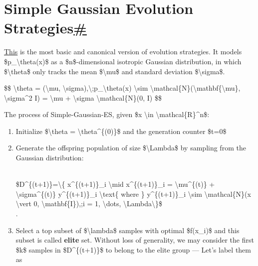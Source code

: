 \section{\texorpdfstring{Simple Gaussian Evolution Strategies\hyperref[simple-gaussian-evolution-strategies]{\#}}{Simple Gaussian Evolution Strategies\#}}\label{simple-gaussian-evolution-strategies}

\href{http://blog.otoro.net/2017/10/29/visual-evolution-strategies/}{This} is the most basic and canonical version of evolution strategies. It models \$p\_\textbackslash theta(x)\$ as a \$n\$-dimensional isotropic Gaussian distribution, in which \$\textbackslash theta\$ only tracks the mean \$\textbackslash mu\$ and standard deviation \$\textbackslash sigma\$.

\$\$ \textbackslash theta = (\textbackslash mu, \textbackslash sigma),\textbackslash;p\_\textbackslash theta(x) \textbackslash sim \textbackslash mathcal\{N\}(\textbackslash mathbf\{\textbackslash mu\}, \textbackslash sigma\^{}2 I) = \textbackslash mu + \textbackslash sigma \textbackslash mathcal\{N\}(0, I) \$\$

The process of Simple-Gaussian-ES, given \$x \textbackslash in \textbackslash mathcal\{R\}\^{}n\$:

\begin{enumerate}
\tightlist
\item
  Initialize \$\textbackslash theta = \textbackslash theta\^{}\{(0)\}\$ and the generation counter \$t=0\$
\item
  Generate the offspring population of size \$\textbackslash Lambda\$ by sampling from the Gaussian distribution:\\
  \strut \\
  \$D\^{}\{(t+1)\}=\textbackslash\{ x\^{}\{(t+1)\}\_i \textbackslash mid x\^{}\{(t+1)\}\_i = \textbackslash mu\^{}\{(t)\} + \textbackslash sigma\^{}\{(t)\} y\^{}\{(t+1)\}\_i \textbackslash text\{ where \} y\^{}\{(t+1)\}\_i \textbackslash sim \textbackslash mathcal\{N\}(x \textbackslash vert 0, \textbackslash mathbf\{I\}),;i = 1, \textbackslash dots, \textbackslash Lambda\textbackslash\}\$\\
  .
\item
  Select a top subset of \$\textbackslash lambda\$ samples with optimal \$f(x\_i)\$ and this subset is called \textbf{elite} set. Without loss of generality, we may consider the first \$k\$ samples in \$D\^{}\{(t+1)\}\$ to belong to the elite group --- Let's label them as
\end{enumerate}

